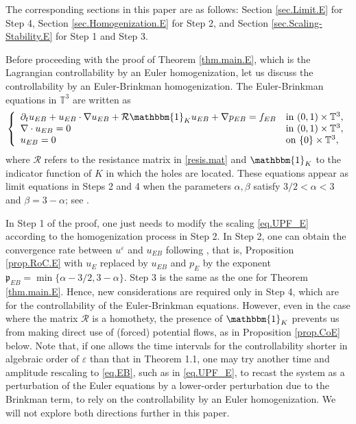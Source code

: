 \documentclass[11pt,a4paper]{article}
\numberwithin{equation}{section}
\newcommand{\T}{\mathbb{T}}
\newcommand{\eps}{\varepsilon}
\begin{document}
\begin{remark}\label{rem.outline}
The corresponding sections in this paper are as follows: Section \ref{sec.Limit.E} for Step 4,  Section \ref{sec.Homogenization.E} for Step 2, and Section \ref{sec.Scaling-Stability.E} for Step 1 and Step 3. 
\end{remark}


Before proceeding with the proof of Theorem \ref{thm.main.E}, which is the Lagrangian controllability by an Euler homogenization, let us discuss the controllability by an Euler-Brinkman homogenization. The Euler-Brinkman equations in $\T^3$ are written as 
\begin{equation}\label{eq.EB}
    \left\{
    \begin{array}{ll}
    \partial_t u_{EB} + u_{EB}\cdot\nabla u_{EB} + \mathcal{R} \mathbbm{1}_{K} u_{EB} + \nabla p_{EB} = f_{EB} &\mbox{in}\ (0,1)\times\T^3,\\
    \nabla\cdot u_{EB} = 0 &\mbox{in}\ (0,1)\times\T^3,\\
    u_{EB}=0 &\mbox{on}\ \{0\}\times\T^3, 
    \end{array}\right.
\end{equation}
where $\mathcal{R}$ refers to the resistance matrix in \eqref{resis.mat} and $\mathbbm{1}_{K}$ to the indicator function of $K$ in which the holes are located. These equations appear as limit equations in Steps 2 and 4 when the parameters $\alpha,\beta$ satisfy $3/2 < \alpha < 3$ and $\beta = 3 - \alpha$; see \cite[Theorem 1.1]{Hof23}. 


In Step 1 of the proof, one just needs to modify the scaling \eqref{eq.UPF_E} according to the homogenization process in Step 2. In Step 2, one can obtain the convergence rate between $u^\eps$ and $u_{EB}$ following \cite[Proof of Theorem 1.1]{Hof23}, that is, Proposition \ref{prop.RoC.E} with $u_E$ replaced by $u_{EB}$ and $p_E$ by the exponent $\mathfrak p_{EB} = \min\{\alpha-3/2, 3-\alpha\}$. Step 3 is the same as the one for Theorem \ref{thm.main.E}. Hence, new considerations are required only in Step 4, which are for the controllability of the Euler-Brinkman equations. However, even in the case where the matrix $ \mathcal{R}$ is a homothety, the presence of $\mathbbm{1}_{K}$ prevents us from making direct use of (forced) potential flows, as in Proposition \ref{prop.CoE} below. Note that, if one allows the time intervals for the controllability shorter in algebraic order of $\eps$ than that in Theorem 1.1, one may try another time and amplitude rescaling to \eqref{eq.EB}, such as in \eqref{eq.UPF_E}, to recast the system as a perturbation of the Euler equations by a lower-order perturbation due to the Brinkman term, to rely on the controllability by an Euler homogenization. We will not explore both directions further in this paper. 
\end{document}
